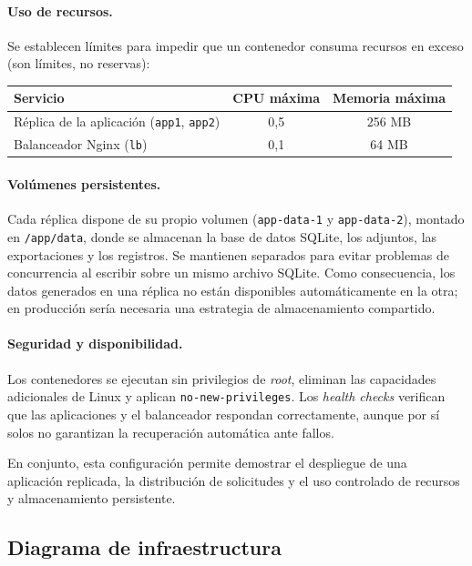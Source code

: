 \documentclass[11pt,letterpaper]{article}
\newcommand{\f}[1]{\texttt{#1}}
\newcommand{\enc}[1]{\textbf{#1}}
\begin{document}
\paragraph{Uso de recursos.} Se establecen límites para impedir que un contenedor consuma recursos en exceso (son límites, no reservas):
\begin{center}
\begin{tabular}{lcc}
\toprule
\enc{Servicio} & \enc{CPU máxima} & \enc{Memoria máxima} \\
\midrule
Réplica de la aplicación (\f{app1}, \f{app2}) & 0,5 & 256 MB \\
Balanceador Nginx (\f{lb}) & 0,1 & 64 MB \\
\bottomrule
\end{tabular}
\end{center}

\paragraph{Volúmenes persistentes.} Cada réplica dispone de su propio volumen (\f{app-data-1} y \f{app-data-2}), montado en \f{/app/data}, donde se almacenan la base de datos SQLite, los adjuntos, las exportaciones y los registros. Se mantienen separados para evitar problemas de concurrencia al escribir sobre un mismo archivo SQLite. Como consecuencia, los datos generados en una réplica no están disponibles automáticamente en la otra; en producción sería necesaria una estrategia de almacenamiento compartido.

\paragraph{Seguridad y disponibilidad.} Los contenedores se ejecutan sin privilegios de \textit{root}, eliminan las capacidades adicionales de Linux y aplican \f{no-new-privileges}. Los \textit{health checks} verifican que las aplicaciones y el balanceador respondan correctamente, aunque por sí solos no garantizan la recuperación automática ante fallos.

En conjunto, esta configuración permite demostrar el despliegue de una aplicación replicada, la distribución de solicitudes y el uso controlado de recursos y almacenamiento persistente.

\subsection{Diagrama de infraestructura}
\end{document}
